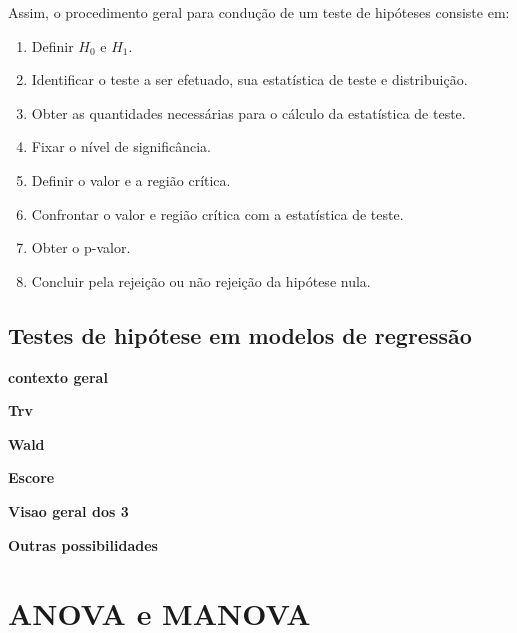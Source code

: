Assim, o procedimento geral para condução de um teste de hipóteses 
consiste em: 

\begin{enumerate}
  
  \item Definir $H_0$ e $H_1$.
  
  \item Identificar o teste a ser efetuado, sua estatística de teste e 
distribuição.
  
  \item Obter as quantidades necessárias para o cálculo da estatística de teste.
  
  \item Fixar o nível de significância.
  
  \item Definir o valor e a região crítica.
  
  \item Confrontar o valor e região crítica com a estatística de teste.
  
  \item Obter o p-valor.
  
  \item Concluir pela rejeição ou não rejeição da hipótese nula.
  
\end{enumerate}

\subsection{Testes de hipótese em modelos de regressão}

\textbf{contexto geral}

\textbf{Trv}

\textbf{Wald} 

\textbf{Escore}

\textbf{Visao geral dos 3}

\textbf{Outras possibilidades}


\section{ANOVA e MANOVA}



